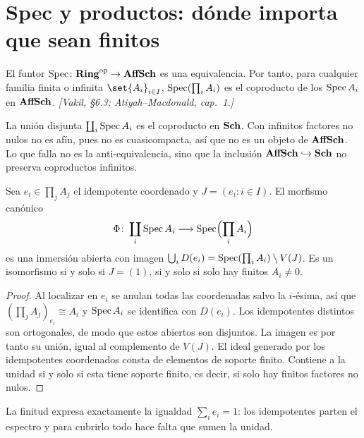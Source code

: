 \section{Spec y productos: dónde importa que sean finitos}

\begin{teo}
\label{teo:s01-anti-equivalencia-sin-restricciones}
El funtor $\operatorname{Spec}\colon \mathbf{Ring}^{\mathrm{op}}\to\mathbf{AffSch}$ es una equivalencia. Por tanto, para cualquier familia finita o infinita $\set{A_i}_{i\in I}$, $\operatorname{Spec}(\prod_i A_i)$ es el coproducto de los $\operatorname{Spec} A_i$ en $\mathbf{AffSch}$. \emph{[Vakil, \S6.3; Atiyah--Macdonald, cap.~1.]}
\end{teo}

\begin{nota}[Advertencia]
La unión disjunta $\coprod_i\operatorname{Spec} A_i$ es el coproducto en $\mathbf{Sch}$. Con infinitos factores no nulos no es afín, pues no es cuasicompacta, así que no es un objeto de $\mathbf{AffSch}$. Lo que falla no es la anti-equivalencia, sino que la inclusión $\mathbf{AffSch}\hookrightarrow\mathbf{Sch}$ no preserva coproductos infinitos.
\end{nota}

\begin{prop}
\label{prop:s01-comparacion-explicita}
Sea $e_i\in\prod_jA_j$ el idempotente coordenado y $J=(e_i:i\in I)$. El morfismo canónico
\[
\Phi\colon \coprod_i\operatorname{Spec} A_i\longrightarrow\operatorname{Spec}\Bigl(\prod_i A_i\Bigr)
\]
es una inmersión abierta con imagen $\bigcup_iD(e_i)=\operatorname{Spec}(\prod_iA_i)\setminus V(J)$. Es un isomorfismo si y solo si $J=(1)$, si y solo si solo hay finitos $A_i\ne0$.
\end{prop}
\begin{proof}
Al localizar en $e_i$ se anulan todas las coordenadas salvo la $i$-ésima, así que $(\prod_jA_j)_{e_i}\cong A_i$ y $\operatorname{Spec} A_i$ se identifica con $D(e_i)$. Los idempotentes distintos son ortogonales, de modo que estos abiertos son disjuntos. La imagen es por tanto su unión, igual al complemento de $V(J)$. El ideal generado por los idempotentes coordenados consta de elementos de soporte finito. Contiene a la unidad si y solo si esta tiene soporte finito, es decir, si solo hay finitos factores no nulos.
\end{proof}

\begin{obs}
\label{obs:s01-finitud}
La finitud expresa exactamente la igualdad $\sum_i e_i=1$: los idempotentes parten el espectro y para cubrirlo todo hace falta que sumen la unidad.
\end{obs}

